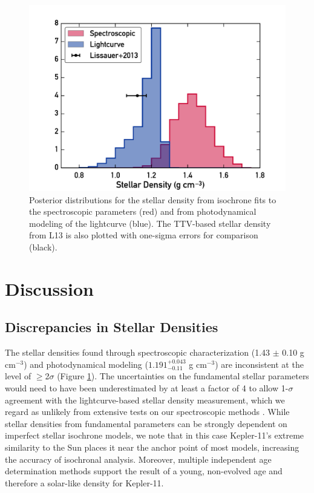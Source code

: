 \documentclass[twocolumn,trackchanges]{aastex61}
\newcommand{\gcm}{g cm$^{-3}$}
\begin{document}
\begin{figure}
\centering
\includegraphics[width=\columnwidth]{density}
\caption{Posterior distributions for the stellar density from isochrone fits to the spectroscopic parameters (red) and from photodynamical modeling of the lightcurve (blue). The TTV-based stellar density from L13 is also plotted with one-sigma errors for comparison (black).}
\label{fig:densities}
\end{figure}


\section{Discussion}
\label{s:discussion}
\subsection{Discrepancies in Stellar Densities}

The stellar densities found through spectroscopic characterization (1.43 $\pm$ 0.10 \gcm) and photodynamical modeling ($1.191^{+0.043}_{-0.11} $ \gcm) are inconsistent at the level of $\geq$2$\sigma$ (Figure \ref{fig:densities}). The uncertainties on the fundamental stellar parameters would need to have been underestimated by at least a factor of 4 to allow 1-$\sigma$ agreement with the lightcurve-based stellar density measurement, which we regard as unlikely from extensive tests on our spectroscopic methods \citep{Bedell2014,Ramirez2014}. While stellar densities from fundamental parameters can be strongly dependent on imperfect stellar isochrone models, we note that in this case Kepler-11's extreme similarity to the Sun places it near the anchor point of most models, increasing the accuracy of isochronal analysis. Moreover, multiple independent age determination methods support the result of a young, non-evolved age and therefore a solar-like density for Kepler-11.
\end{document}
